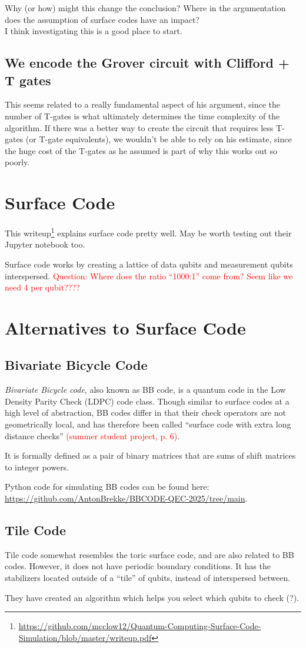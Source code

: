 Why (or how) might this change the conclusion? Where in the argumentation does the assumption of surface codes have an impact?\\

I think investigating this is a good place to start.


\subsection{We encode the Grover circuit with Clifford + T gates}
This seems related to a really fundamental aspect of his argument, since the number of T-gates is what ultimately determines the time complexity of the algorithm. If there was a better way to create the circuit that requires less T-gates (or T-gate equivalents), we wouldn't be able to rely on his estimate, since the huge cost of the T-gates as he assumed is part of why this works out so poorly.

\section{Surface Code}
This writeup\footnote{\url{https://github.com/mcclow12/Quantum-Computing-Surface-Code-Simulation/blob/master/writeup.pdf}} explains surface code pretty well. May be worth testing out their Jupyter notebook too. 

Surface code works by creating a lattice of data qubits and measurement qubits interspersed. 
\textcolor{red}{Question: Where does the ratio ``1000:1'' come from? Seem like we need 4 per qubit????}

\section{Alternatives to Surface Code}
\subsection{Bivariate Bicycle Code}
\emph{Bivariate Bicycle code}, also known as BB code, is a quantum code in the Low Density Parity Check (LDPC) code class. Though similar to surface codes at a high level of abstraction, BB codes differ in that their check operators are not geometrically local, and has therefore been called ``surface code with extra long distance checks'' \textcolor{red}{(summer student project, p. 6)}. 

It is formally defined as a pair of binary matrices that are sums of shift matrices to integer powers.

Python code for simulating BB codes can be found here: \url{https://github.com/AntonBrekke/BBCODE-QEC-2025/tree/main}.

\subsection{Tile Code}
Tile code somewhat resembles the toric surface code, and are also related to BB codes. However, it does not have  periodic boundary conditions. It has the stabilizers located outside of a ``tile'' of qubits, instead of interspersed between. 

They have created an algorithm which helps you select which qubits to check (?). 
